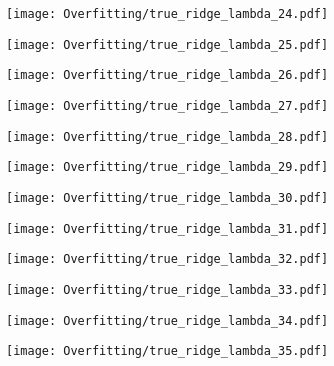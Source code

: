 \documentclass[xcolor=pdftex,dvipsnames,table]{beamer}
\begin{document}
\frame
{
	\begin{center}
		\texttt{[image: Overfitting/true\_ridge\_lambda\_24.pdf]}
	\end{center}
}

\frame
{
	\begin{center}
		\texttt{[image: Overfitting/true\_ridge\_lambda\_25.pdf]}
	\end{center}
}

\frame
{
	\begin{center}
		\texttt{[image: Overfitting/true\_ridge\_lambda\_26.pdf]}
	\end{center}
}

\frame
{
	\begin{center}
		\texttt{[image: Overfitting/true\_ridge\_lambda\_27.pdf]}
	\end{center}
}

\frame
{
	\begin{center}
		\texttt{[image: Overfitting/true\_ridge\_lambda\_28.pdf]}
	\end{center}
}

\frame
{
	\begin{center}
		\texttt{[image: Overfitting/true\_ridge\_lambda\_29.pdf]}
	\end{center}
}

\frame
{
	\begin{center}
		\texttt{[image: Overfitting/true\_ridge\_lambda\_30.pdf]}
	\end{center}
}

\frame
{
	\begin{center}
		\texttt{[image: Overfitting/true\_ridge\_lambda\_31.pdf]}
	\end{center}
}

\frame
{
	\begin{center}
		\texttt{[image: Overfitting/true\_ridge\_lambda\_32.pdf]}
	\end{center}
}

\frame
{
	\begin{center}
		\texttt{[image: Overfitting/true\_ridge\_lambda\_33.pdf]}
	\end{center}
}

\frame
{
	\begin{center}
		\texttt{[image: Overfitting/true\_ridge\_lambda\_34.pdf]}
	\end{center}
}

\frame
{
	\begin{center}
		\texttt{[image: Overfitting/true\_ridge\_lambda\_35.pdf]}
	\end{center}
}
\end{document}
